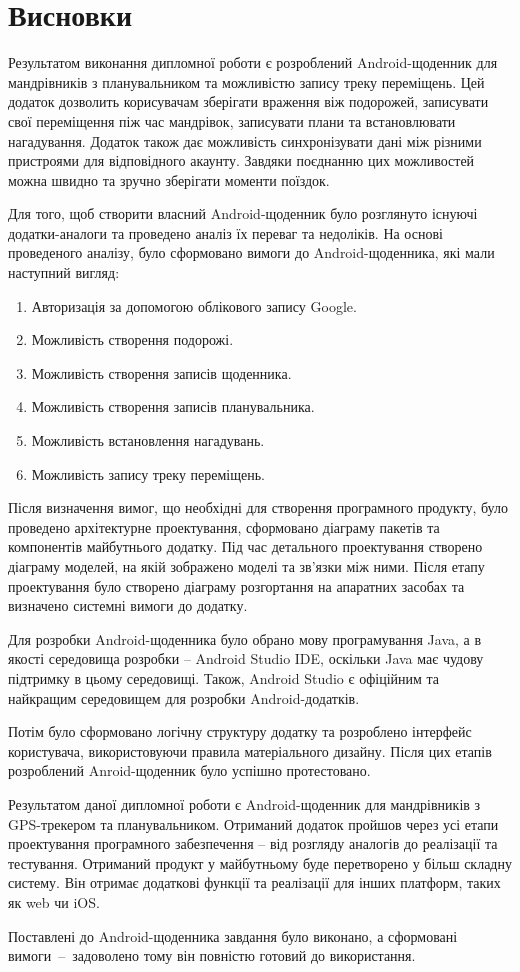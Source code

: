 \documentclass[../main.tex]{subfiles}
\begin{document}
\chapter*{Висновки}
	
Результатом виконання дипломної роботи є розроблений Android-щоденник для мандрівників з планувальником та можливістю запису треку переміщень. Цей додаток дозволить корисувачам зберігати враження віж подорожей, записувати свої переміщення піж час мандрівок, записувати плани та встановлювати нагадування. Додаток також дає можливість синхронізувати дані між різними пристроями для відповідного акаунту. Завдяки поєднанню цих можливостей можна швидно та зручно зберігати моменти поїздок.
	
Для того, щоб створити власний Android-щоденник було розглянуто існуючі додатки-аналоги та проведено аналіз їх переваг та недоліків.  На основі проведеного аналізу, було сформовано вимоги до Android-щоденника, які мали наступний вигляд:

\begin{enumerate}
	\item Авторизація за допомогою облікового запису Google.
	\item Можливість створення подорожі.
	\item Можливість створення записів щоденника.
	\item Можливість створення записів планувальника.
	\item Можливість встановлення нагадувань.
	\item Можливість запису треку переміщень.
\end{enumerate}

Після визначення вимог, що необхідні для створення програмного продукту, було проведено архітектурне проектування, сформовано діаграму пакетів та компонентів майбутнього додатку. Під час детального проектування створено діаграму моделей, на якій зображено моделі та зв'язки між ними. Після етапу проектування було створено діаграму розгортання на апаратних засобах та визначено системні вимоги до додатку.

Для розробки Android-щоденника було обрано мову програмування Java, а в якості середовища розробки -- Android Studio IDE, оскільки Java має чудову підтримку в цьому середовищі. Також, Android Studio є офіційним та найкращим середовищем для розробки Android-додатків.

Потім було сформовано логічну структуру додатку та розроблено інтерфейс користувача, використовуючи правила матеріального дизайну. Після цих етапів розроблений Anroid-щоденник було успішно протестовано. 

Результатом даної дипломної роботи є Android-щоденник для мандрівників з GPS-трекером та планувальником. Отриманий додаток пройшов через усі етапи проектування програмного забезпечення -- від розгляду аналогів до реалізації та тестування. Отриманий продукт у майбутньому буде перетворено у більш складну систему. Він отримає додаткові функції та реалізації для інших платформ, таких як web чи iOS.

Поставлені до Android-щоденника завдання було виконано, а сформовані вимоги~--~задоволено тому він повністю готовий до використання.

	
\end{document}
